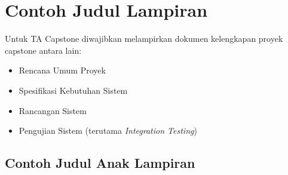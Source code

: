 \chapter{Contoh Judul Lampiran}
\begin{petunjuk}
Untuk TA Capstone diwajibkan melampirkan dokumen kelengkapan proyek capstone antara lain:
\begin{itemize}
  \item Rencana Umum Proyek
  \item Spesifikasi Kebutuhan Sistem
  \item Rancangan Sistem
  \item Pengujian Sistem (terutama \textit{Integration Testing})
\end{itemize}
\end{petunjuk}

\section{Contoh Judul Anak Lampiran}
